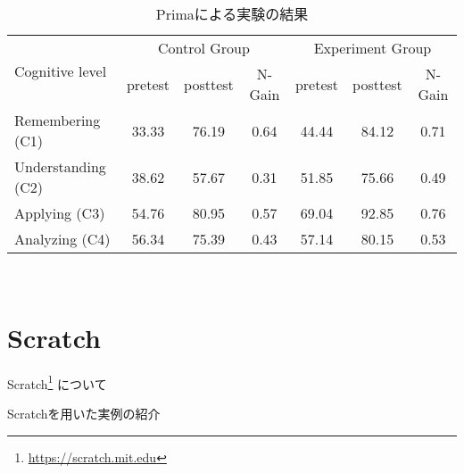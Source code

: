 \begin{table}[h]
\centering
\begin{tabular}{lcccccc}
  \toprule
  \multirow{2}{*}{Cognitive level} & \multicolumn{3}{c}{Control Group} & \multicolumn{3}{c}{Experiment Group}\\
  \cmidrule(lr){2-4} \cmidrule(lr){5-7}
  & pretest & posttest & N-Gain & pretest & posttest & N-Gain\\
  \midrule
  Remembering (C1) & 33.33 & 76.19 & 0.64 & 44.44 & 84.12 & 0.71\\
  Understanding (C2) & 38.62 & 57.67 & 0.31 & 51.85 & 75.66 & 0.49\\
  Applying (C3) & 54.76 & 80.95 & 0.57 & 69.04 & 92.85 & 0.76\\
  Analyzing (C4) & 56.34 & 75.39 & 0.43 & 57.14 & 80.15 & 0.53\\
  \bottomrule
\end{tabular}

\caption{Primaによる実験の結果}
\label{prima_table}
\end{table}





~\cite{rehman_teaching_2021}

\section{Scratch}

Scratch\footnote{\url{https://scratch.mit.edu}} について

Scratchを用いた実例の紹介
~\cite{Lpez2015ScratchAA}


